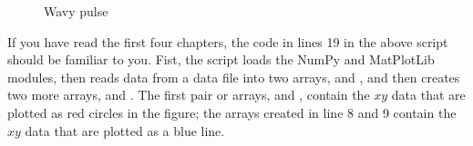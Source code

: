 \documentclass[letterpaper,10pt,english]{sphinxmanual}
\begin{document}
\begin{figure}[htbp]
\centering
\capstart

\noindent{}
\caption{Wavy pulse}\label{\detokenize{chap5/chap5_plot:id4}}\label{\detokenize{chap5/chap5_plot:fig-wavypulse}}\end{figure}

\sphinxAtStartPar
If you have read the first four chapters, the code in lines 1\sphinxhyphen{}9 in the above script should  be familiar to you.  Fist, the script loads the NumPy and MatPlotLib modules, then reads data from a data file into two arrays,  and , and then creates two more arrays,  and .  The first pair or arrays,  and , contain the \(x\)\sphinxhyphen{}\(y\) data that are plotted as red circles in the {\hyperref[\detokenize{chap5/chap5_plot:fig-wavypulse}]{}} figure; the arrays created in line 8 and 9 contain the \(x\)\sphinxhyphen{}\(y\) data that are plotted as a blue line.
\end{document}
